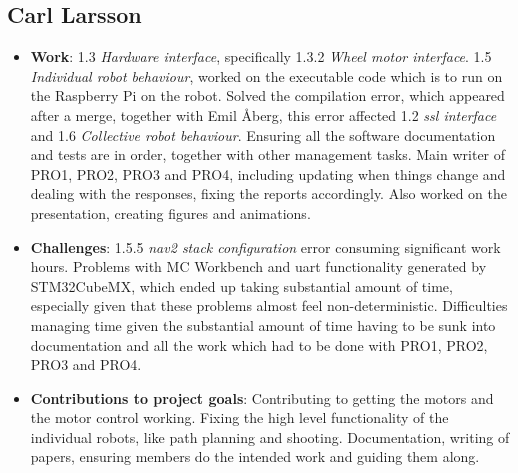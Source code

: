 \subsection*{Carl Larsson}
\begin{itemize}
    \item \textbf{Work}: 1.3 \textit{Hardware interface}, specifically 1.3.2 \textit{Wheel motor interface}. 1.5 \textit{Individual robot behaviour}, worked on the executable code which is to run on the Raspberry Pi on the robot. Solved the compilation error, which appeared after a merge, together with Emil Åberg, this error affected 1.2 \textit{\acs{ssl} interface} and 1.6 \textit{Collective robot behaviour}. Ensuring all the software documentation and tests are in order, together with other management tasks. Main writer of PRO1, PRO2, PRO3 and PRO4, including updating when things change and dealing with the responses, fixing the reports accordingly. Also worked on the presentation, creating figures and animations.
    \item \textbf{Challenges}: 1.5.5 \textit{nav2 stack configuration} error consuming significant work hours. Problems with MC Workbench and \ac{uart} functionality generated by STM32CubeMX, which ended up taking substantial amount of time, especially given that these problems almost feel non-deterministic. Difficulties managing time given the substantial amount of time having to be sunk into documentation and all the work which had to be done with PRO1, PRO2, PRO3 and PRO4.
    \item \textbf{Contributions to project goals}: Contributing to getting the motors and the motor control working. Fixing the high level functionality of the individual robots, like path planning and shooting. Documentation, writing of papers, ensuring members do the intended work and guiding them along.
\end{itemize}
